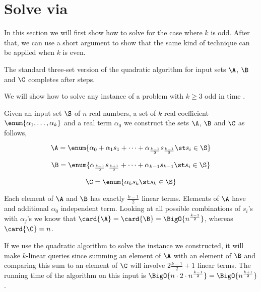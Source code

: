 \section{Solve \kLDT via \threeSUM}

In this section we will first show how to solve \kLDT for the case where \(k\)
is odd. After that, we can use a short argument to show that the same kind of
technique can be applied when \(k\) is even.

The standard three-set version of the quadratic \threeSUM algorithm for input
sets \(\A\), \(\B\) and \(\C\) completes after \BigO{\card{\C} ( \card{\A} +
\card{\B} ) } steps.

We will show how to solve any instance of a \kLDT problem with \(k \ge 3\) odd
in time .

Given an input set \(\S\) of \(n\) real numbers, a set of \(k\) real
coefficient \( \enum{\alpha_1,\ldots,\alpha_k}\) and a real term \(\alpha_0\)
we construct the sets \(\A\), \(\B\) and \(\C\) as follows,

\begin{displaymath}
\A = \enum{\alpha_0 + \alpha_1 s_1 + \cdots + \alpha_{\frac{k-1}{2}} s_{\frac{k-1}{2}} \st s_i \in \S}
\end{displaymath}

\begin{displaymath}
\B = \enum{\alpha_{\frac{k+1}{2}} s_{\frac{k+1}{2}} + \cdots + \alpha_{k-1} s_{k-1} \st s_i \in \S}
\end{displaymath}

\begin{displaymath}
\C = \enum{\alpha_k s_k \st s_k \in \S}
\end{displaymath}

Each element of \(\A\) and \(\B\) has exactly \(\frac{k-1}{2}\) linear terms.
Elements of \(\A\) have and additional \(\alpha_0\) independent term. Looking
at all possible combinations of \(s_i\)'s with \(\alpha_j\)'s we know that
\(\card{\A} = \card{\B} = \BigO{n^{\frac{k-1}{2}}}\), whereas \(\card{\C} =
n\).

If we use the quadratic \threeSUM algorithm to solve the instance we
constructed, it will make \(k\)-linear queries since summing an element of
\(\A\) with an element of \(\B\) and comparing this sum to an element of
\(\C\) will involve \(2 \frac{k-1}{2} + 1\) linear terms. The running time of
the \threeSUM algorithm on this input is \(\BigO{n \cdot 2 \cdot n^{\frac{k-1}{2}}} =
\BigO{n^{\frac{k+1}{2}}}\).

